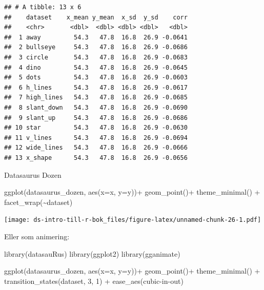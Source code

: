 \documentclass[
]{book}
\newenvironment{Shaded}{\begin{snugshade}}{\end{snugshade}}
\newcommand{\AttributeTok}[1]{\textcolor[rgb]{0.77,0.63,0.00}{#1}}
\newcommand{\DecValTok}[1]{\textcolor[rgb]{0.00,0.00,0.81}{#1}}
\newcommand{\FunctionTok}[1]{\textcolor[rgb]{0.00,0.00,0.00}{#1}}
\newcommand{\NormalTok}[1]{#1}
\newcommand{\SpecialCharTok}[1]{\textcolor[rgb]{0.00,0.00,0.00}{#1}}
\newcommand{\StringTok}[1]{\textcolor[rgb]{0.31,0.60,0.02}{#1}}
\begin{document}
\begin{verbatim}
## # A tibble: 13 x 6
##    dataset    x_mean y_mean  x_sd  y_sd    corr
##    <chr>       <dbl>  <dbl> <dbl> <dbl>   <dbl>
##  1 away         54.3   47.8  16.8  26.9 -0.0641
##  2 bullseye     54.3   47.8  16.8  26.9 -0.0686
##  3 circle       54.3   47.8  16.8  26.9 -0.0683
##  4 dino         54.3   47.8  16.8  26.9 -0.0645
##  5 dots         54.3   47.8  16.8  26.9 -0.0603
##  6 h_lines      54.3   47.8  16.8  26.9 -0.0617
##  7 high_lines   54.3   47.8  16.8  26.9 -0.0685
##  8 slant_down   54.3   47.8  16.8  26.9 -0.0690
##  9 slant_up     54.3   47.8  16.8  26.9 -0.0686
## 10 star         54.3   47.8  16.8  26.9 -0.0630
## 11 v_lines      54.3   47.8  16.8  26.9 -0.0694
## 12 wide_lines   54.3   47.8  16.8  26.9 -0.0666
## 13 x_shape      54.3   47.8  16.8  26.9 -0.0656
\end{verbatim}

Datasaurus Dozen

\begin{Shaded}
\begin{Highlighting}[]
\FunctionTok{ggplot}\NormalTok{(datasaurus\_dozen, }\FunctionTok{aes}\NormalTok{(}\AttributeTok{x=}\NormalTok{x, }\AttributeTok{y=}\NormalTok{y))}\SpecialCharTok{+}
  \FunctionTok{geom\_point}\NormalTok{()}\SpecialCharTok{+}
  \FunctionTok{theme\_minimal}\NormalTok{() }\SpecialCharTok{+}
  \FunctionTok{facet\_wrap}\NormalTok{(}\SpecialCharTok{\textasciitilde{}}\NormalTok{dataset)}
\end{Highlighting}
\end{Shaded}

\texttt{[image: ds-intro-till-r-bok\_files/figure-latex/unnamed-chunk-26-1.pdf]}

Eller som animering:

\begin{Shaded}
\begin{Highlighting}[]
\FunctionTok{library}\NormalTok{(datasauRus)}
\FunctionTok{library}\NormalTok{(ggplot2)}
\FunctionTok{library}\NormalTok{(gganimate)}

\FunctionTok{ggplot}\NormalTok{(datasaurus\_dozen, }\FunctionTok{aes}\NormalTok{(}\AttributeTok{x=}\NormalTok{x, }\AttributeTok{y=}\NormalTok{y))}\SpecialCharTok{+}
  \FunctionTok{geom\_point}\NormalTok{()}\SpecialCharTok{+}
  \FunctionTok{theme\_minimal}\NormalTok{() }\SpecialCharTok{+}
  \FunctionTok{transition\_states}\NormalTok{(dataset, }\DecValTok{3}\NormalTok{, }\DecValTok{1}\NormalTok{) }\SpecialCharTok{+} 
  \FunctionTok{ease\_aes}\NormalTok{(}\StringTok{\textquotesingle{}cubic{-}in{-}out\textquotesingle{}}\NormalTok{)}
\end{Highlighting}
\end{Shaded}
\end{document}
